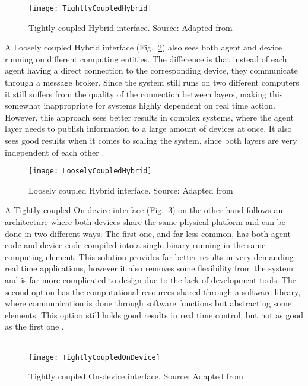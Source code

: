 \begin{figure}[h!]
	\centering
	\texttt{[image: TightlyCoupledHybrid]}
	\caption{Tightly coupled Hybrid interface. Source: Adapted from \cite{8591641}}
	\label{fig:tightly_coupled_hybrid}
\end{figure}

A Loosely coupled Hybrid interface (Fig.~\ref{fig:loosely_coupled_hybrid}) also sees both agent and device running on different computing entities. The difference is that instead of each agent having a direct connection to the corresponding device, they communicate through a message broker. Since the system still runs on two different computers it still suffers from the quality of the connection between layers, making this somewhat inappropriate for systems highly dependent on real time action. However, this approach sees better results in complex systems, where the agent layer needs to publish information to a large amount of devices at once. It also sees good results when it comes to scaling the system, since both layers are very independent of each other \cite{8591641}.\\

\begin{figure}[h!]
	\centering
	\texttt{[image: LooselyCoupledHybrid]}
	\caption{Loosely coupled Hybrid interface. Source: Adapted from \cite{8591641}}
	\label{fig:loosely_coupled_hybrid}
\end{figure}

A Tightly coupled On-device interface (Fig.~\ref{fig:tightly_coupled_ondevice}) on the other hand follows an architecture where both devices share the same physical platform and can be done in two different ways. The first one, and far less common, has both agent code and device code compiled into a single binary running in the same computing element. This solution provides far better results in very demanding real time applications, however it also removes some flexibility from the system and is far more complicated to design due to the lack of development tools. The second option has the computational resources shared through a software library, where communication is done through software functions but abstracting some elements. This option still holds good results in real time control, but not as good as the first one \cite{8591641}.\\\\

\begin{figure}[h!]
	\centering
	\texttt{[image: TightlyCoupledOnDevice]}
	\caption{Tightly coupled On-device interface. Source: Adapted from \cite{8591641}}
	\label{fig:tightly_coupled_ondevice}
\end{figure}


